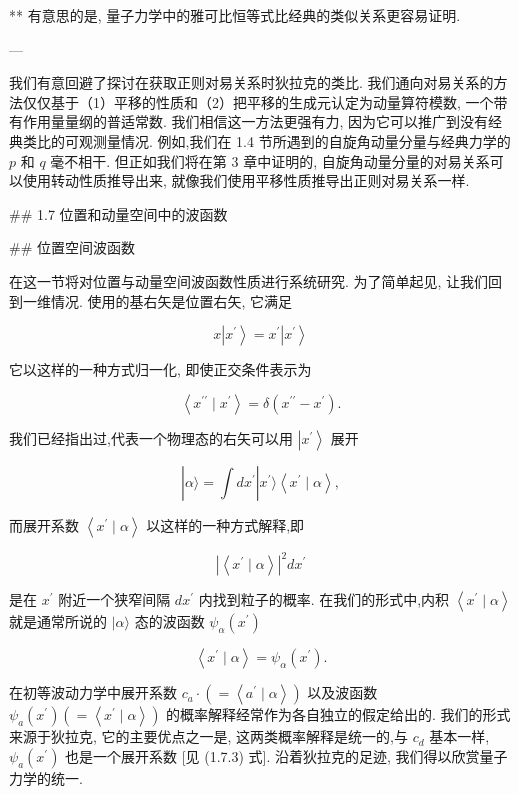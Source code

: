 \documentclass[lang=cn,newtx,10pt,scheme=chinese,thmcnt=section]{elegantbook}
\begin{document}
** 有意思的是, 量子力学中的雅可比恒等式比经典的类似关系更容易证明.

---

我们有意回避了探讨在获取正则对易关系时狄拉克的类比. 我们通向对易关系的方法仅仅基于（1）平移的性质和（2）把平移的生成元认定为动量算符模数, 一个带有作用量量纲的普适常数. 我们相信这一方法更强有力, 因为它可以推广到没有经典类比的可观测量情况. 例如,我们在 1.4 节所遇到的自旋角动量分量与经典力学的 $p$ 和 $q$ 毫不相干. 但正如我们将在第 3 章中证明的, 自旋角动量分量的对易关系可以使用转动性质推导出来, 就像我们使用平移性质推导出正则对易关系一样.

## 1.7 位置和动量空间中的波函数

## 位置空间波函数

在这一节将对位置与动量空间波函数性质进行系统研究. 为了简单起见, 让我们回到一维情况. 使用的基右矢是位置右矢, 它满足

$$
x\left| {x}^{\prime }\right\rangle = {x}^{\prime }\left| {x}^{\prime }\right\rangle \tag{1.7.1}
$$

它以这样的一种方式归一化, 即使正交条件表示为

$$
\left\langle {{x}^{\prime \prime } \mid {x}^{\prime }}\right\rangle = \delta \left( {{x}^{\prime \prime } - {x}^{\prime }}\right) . \tag{1.7.2}
$$

我们已经指出过,代表一个物理态的右矢可以用 $\left| {x}^{\prime }\right\rangle$ 展开

$$
\left| {\alpha \rangle = \int d{x}^{\prime }}\right| {x}^{\prime }\rangle \left\langle {{x}^{\prime } \mid \alpha }\right\rangle , \tag{1. 7.3}
$$

而展开系数 $\left\langle {{x}^{\prime } \mid \alpha }\right\rangle$ 以这样的一种方式解释,即

$$
{\left| \left\langle {x}^{\prime } \mid \alpha \right\rangle \right| }^{2}d{x}^{\prime } \tag{1.7.4}
$$

是在 ${x}^{\prime }$ 附近一个狭窄间隔 $d{x}^{\prime }$ 内找到粒子的概率. 在我们的形式中,内积 $\left\langle {{x}^{\prime } \mid \alpha }\right\rangle$ 就是通常所说的 $|\alpha \rangle$ 态的波函数 ${\psi }_{\alpha }\left( {x}^{\prime }\right)$

$$
\left\langle {{x}^{\prime } \mid \alpha }\right\rangle = {\psi }_{\alpha }\left( {x}^{\prime }\right) . \tag{1. 7.5}
$$

在初等波动力学中展开系数 ${c}_{a} \cdot \left( { = \left\langle {{a}^{\prime } \mid \alpha }\right\rangle }\right)$ 以及波函数 ${\psi }_{a}\left( {x}^{\prime }\right) \left( { = \left\langle {{x}^{\prime } \mid \alpha }\right\rangle }\right)$ 的概率解释经常作为各自独立的假定给出的. 我们的形式来源于狄拉克, 它的主要优点之一是, 这两类概率解释是统一的,与 ${c}_{d}$ 基本一样, ${\psi }_{a}\left( {x}^{\prime }\right)$ 也是一个展开系数 [见 (1.7.3) 式]. 沿着狄拉克的足迹, 我们得以欣赏量子力学的统一.
\end{document}
